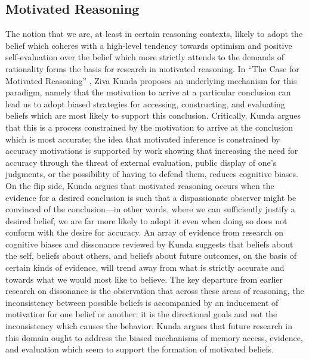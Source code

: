 \documentclass{article}
\begin{document}
\subsection{Motivated Reasoning}
The notion that we are, at least in certain reasoning contexts, likely to adopt the belief which coheres with a high-level tendency towards optimism and positive self-evaluation over the belief which more strictly attends to the demands of rationality forms the basis for research in motivated reasoning. In ``The Case for Motivated Reasoning'' \citet{Kunda1990}, Ziva Kunda proposes an underlying mechanism for this paradigm, namely that the motivation to arrive at a particular conclusion can lead us to adopt biased strategies for accessing, constructing, and evaluating beliefs which are most likely to support this conclusion. Critically, Kunda argues that this is a process constrained by the motivation to arrive at the conclusion which is most accurate; the idea that motivated inference is constrained by accuracy motivations is supported by work showing that increasing the need for accuracy through the threat of external evaluation, public display of one's judgments, or the possibility of having to defend them, reduces cognitive biases. On the flip side, Kunda argues that motivated reasoning occurs when the evidence for a desired conclusion is such that a dispassionate observer might be convinced of the conclusion---in other words, where we can sufficiently justify a desired belief, we are far more likely to adopt it even when doing so does not conform with the desire for accuracy. An array of evidence from research on cognitive biases and dissonance reviewed by Kunda suggests that beliefs about the self, beliefs about others, and beliefs about future outcomes, on the basis of certain kinds of evidence, will trend away from what is strictly accurate and towards what we would most like to believe. The key departure from earlier research on dissonance is the observation that across these areas of reasoning, the inconsistency between possible beliefs is accompanied by an inducement of motivation for one belief or another: it is the directional goals and not the inconsistency which causes the behavior. Kunda argues that future research in this domain ought to address the biased mechanisms of memory access, evidence, and evaluation which seem to support the formation of motivated beliefs. 
\end{document}
